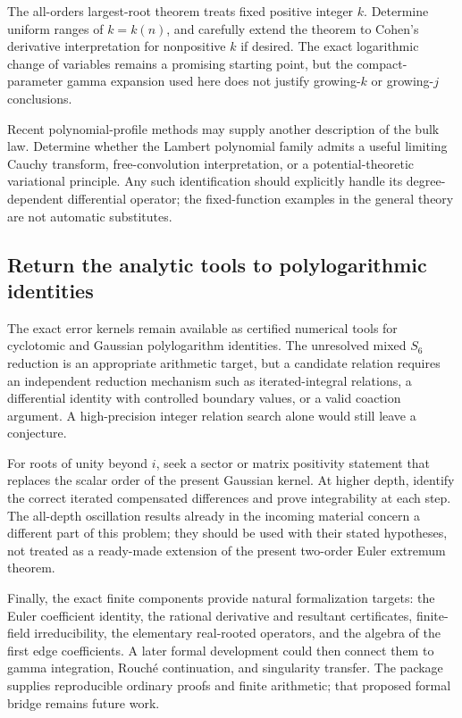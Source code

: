 \documentclass[11pt]{article}
\numberwithin{equation}{section}
\theoremstyle{definition}
\theoremstyle{remark}
\begin{document}
The all-orders largest-root theorem treats fixed positive integer $k$.
Determine uniform ranges of $k=k(n)$, and carefully extend the theorem
to Cohen's derivative interpretation for nonpositive $k$ if desired.
The exact logarithmic change of variables remains a promising starting
point, but the compact-parameter gamma expansion used here does not
justify growing-$k$ or growing-$j$ conclusions.

Recent polynomial-profile methods \cite{JalowyKabluchkoMarynych2026}
may supply another description of the bulk law. Determine whether the
Lambert polynomial family admits a useful limiting Cauchy transform,
free-convolution interpretation, or a potential-theoretic variational
principle. Any such identification should explicitly handle its
degree-dependent differential operator; the fixed-function examples
in the general theory are not automatic substitutes.

\subsection{Return the analytic tools to polylogarithmic identities}

The exact error kernels remain available as certified numerical tools
for cyclotomic and Gaussian polylogarithm identities. The unresolved
mixed $S_6$ reduction is an appropriate arithmetic target, but a
candidate relation requires an independent reduction mechanism such
as iterated-integral relations, a differential identity with controlled
boundary values, or a valid coaction argument. A high-precision integer
relation search alone would still leave a conjecture.

For roots of unity beyond $i$, seek a sector or matrix positivity
statement that replaces the scalar order of the present Gaussian
kernel. At higher depth, identify the correct iterated compensated
differences and prove integrability at each step. The all-depth
oscillation results already in the incoming material concern a
different part of this problem; they should be used with their stated
hypotheses, not treated as a ready-made extension of the present
two-order Euler extremum theorem.

Finally, the exact finite components provide natural formalization
targets: the Euler coefficient identity, the rational derivative and
resultant certificates, finite-field irreducibility, the elementary
real-rooted operators, and the algebra of the first edge coefficients.
A later formal development could then connect them to gamma
integration, Rouch\'e continuation, and singularity transfer. The
package supplies reproducible ordinary proofs and finite arithmetic;
that proposed formal bridge remains future work.
\end{document}
